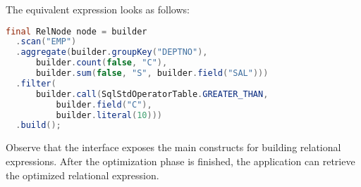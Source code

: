 The equivalent expression looks as follows:

\begin{lstlisting}[language=Java]
final RelNode node = builder
  .scan("EMP")
  .aggregate(builder.groupKey("DEPTNO"),
      builder.count(false, "C"),
      builder.sum(false, "S", builder.field("SAL")))
  .filter(
      builder.call(SqlStdOperatorTable.GREATER_THAN,
          builder.field("C"),
          builder.literal(10)))
  .build();
\end{lstlisting}

Observe that the interface exposes the main constructs for building relational expressions. After the optimization phase is finished, the application can retrieve the optimized relational expression.








